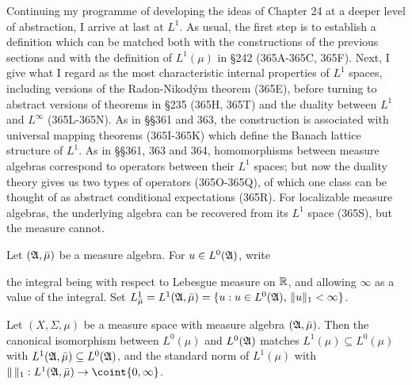      
\def\chaptername{Function spaces}
\def\sectionname{$L^1$}
     
     
Continuing my programme of developing the ideas of Chapter 24 at a
deeper level of abstraction, I arrive at last at $L^1$.   As usual, the
first step is to establish a definition which can be matched both with
the constructions of the previous sections and with the definition of
$L^1(\mu)$ in \S242 (365A-365C, 365F).   Next, I give what I regard as
the most characteristic internal properties of $L^1$ spaces, including
versions of the Radon-Nikod\'ym theorem (365E),
before turning to abstract versions of theorems in \S235 (365H, 365T)
and the duality between $L^1$ and $L^{\infty}$
(365L-365N).   As in \S\S361 and 363, the construction is associated
with universal mapping theorems (365I-365K) which define the Banach
lattice structure of $L^1$.   As in \S\S361, 363 and 364, homomorphisms
between measure algebras correspond to operators between their $L^1$
spaces;  but now the duality theory gives us two types of operators
(365O-365Q), of which one class can be thought of as abstract
conditional expectations (365R).   For localizable measure algebras, the
underlying algebra can be recovered from its $L^1$ space (365S), but the
measure cannot.
     
 Let $(\frak A,\bar\mu)$ be a measure algebra.
For $u\in L^0(\frak A)$, write
     
     
\noindent the integral being with respect to Lebesgue measure on
$\Bbb R$, and allowing $\infty$ as a value of the integral.
   Set
$L^1_{\bar\mu}=L^1(\frak A,\bar\mu)
=\{u:u\in L^0(\frak A),\,\|u\|_1<\infty\}$.
     
     
 Let $(X,\Sigma,\mu)$ be a measure space with
measure algebra $(\frak A,\bar\mu)$.   Then the canonical isomorphism
between $L^0(\mu)$ and $L^0(\frak A)$
matches $L^1(\mu)\subseteq L^0(\mu)$ with
$L^1(\frak A,\bar\mu)\subseteq L^0(\frak A)$, and the standard norm of
$L^1(\mu)$ with
$\|\,\|_1:L^1(\frak A,\bar\mu)\to\coint{0,\infty}$.
     
